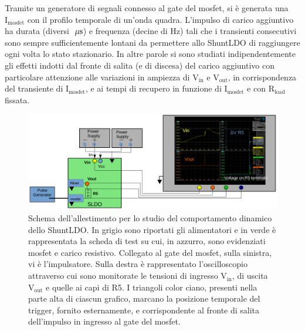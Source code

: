 Tramite un generatore di segnali connesso al gate del mosfet, si \`e generata una $\mathrm{I_{mosfet}}$ con il profilo temporale di un'onda quadra. L'impulso di carico aggiuntivo ha durata (diversi $\; \mu \rm s$) e frequenza (decine di Hz) tali che i transienti consecutivi sono sempre sufficientemente lontani da permettere allo ShuntLDO di raggiungere ogni volta lo stato stazionario. In altre parole si sono studiati indipendentemente gli effetti indotti dal fronte di salita (e di discesa) del carico aggiuntivo con particolare attenzione alle variazioni in ampiezza di $\mathrm{V_{in}}$ e $\mathrm{V_{out}}$, in corrispondenza del transiente di $\mathrm{I_{mosfet}}$, e ai tempi di recupero in funzione di $\mathrm{I_{mosfet}}$ e con $\mathrm{R_{load}}$ fissata.
\begin{figure}[!htb]
\centering
\includegraphics[width=.99\linewidth]{Immagini/SetupScheme}
\caption{Schema dell'allestimento per lo studio del comportamento dinamico dello ShuntLDO. In grigio sono riportati gli alimentatori e in verde è rappresentata la scheda di test su cui, in azzurro, sono evidenziati mosfet e carico resistivo. Collegato al gate del mosfet, sulla sinistra, vi è l'impulsatore. Sulla destra è rappresentato l'oscilloscopio attraverso cui sono monitorate le tensioni di ingresso $\mathrm{V_{in}}$, di uscita $\mathrm{V_{out}}$ e quelle ai capi di R5. I triangoli color ciano, presenti nella parte alta di ciascun grafico, marcano la posizione temporale del trigger, fornito esternamente, e corrispondente al fronte di salita dell'impulso in ingresso al gate del mosfet.}
\label{Setupscheme}
\end{figure}


